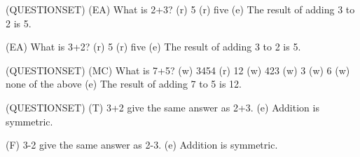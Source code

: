 (QUESTIONSET)
(EA) What is 2+3?
(r) 5
(r) five
(e) The result of adding 3 to 2 is 5.

(EA) What is 3+2?
(r) 5
(r) five
(e) The result of adding 3 to 2 is 5.

(QUESTIONSET)
(MC) What is 7+5?
(w) 3454
(r) 12
(w) 423
(w) 3
(w) 6
(w) none of the above
(e) The result of adding 7 to 5 is 12.

(QUESTIONSET)
(T) 3+2 give the same answer as 2+3.
(e) Addition is symmetric.

(F) 3-2 give the same answer as 2-3.
(e) Addition is symmetric.

